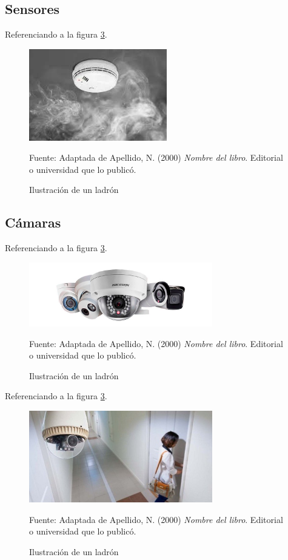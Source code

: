 \subsection{Sensores}
Referenciando a la figura \ref{fig:ejemplo}.
\begin{figure}[H]
    \begin{center}
        \includegraphics[width=6cm]{img/capitulo_3/sensor_de_humo.jpg}
    \end{center}
    \caption{Ilustración de un ladrón}
    Fuente: Adaptada de Apellido, N. (2000) \textit{Nombre del libro}.
    Editorial o universidad que lo publicó.
    \label{fig:ejemplo}
\end{figure}

\subsection{Cámaras}
Referenciando a la figura \ref{fig:ejemplo}.
\begin{figure}[H]
    \begin{center}
        \includegraphics[width=8cm]{img/capitulo_3/camaras.jpg}
    \end{center}
    \caption{Ilustración de un ladrón}
    Fuente: Adaptada de Apellido, N. (2000) \textit{Nombre del libro}.
    Editorial o universidad que lo publicó.
    \label{fig:ejemplo}
\end{figure}

Referenciando a la figura \ref{fig:ejemplo}.
\begin{figure}[H]
    \begin{center}
        \includegraphics[width=8cm]{img/capitulo_3/camara_de_interiores.jpg}
    \end{center}
    \caption{Ilustración de un ladrón}
    Fuente: Adaptada de Apellido, N. (2000) \textit{Nombre del libro}.
    Editorial o universidad que lo publicó.
    \label{fig:ejemplo}
\end{figure}

